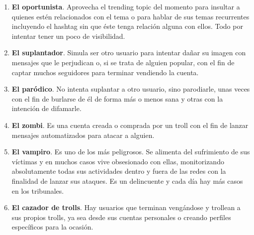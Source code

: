 \documentclass[../all.tex]{subfiles}
\begin{document}
\begin{enumerate}[resume]
        \item \textbf{El oportunista}. Aprovecha el trending topic del momento para insultar a quienes estén relacionados con el tema o para hablar de sus temas recurrentes incluyendo el hashtag sin que éste tenga relación alguna con ellos. Todo por intentar tener un poco de visibilidad.
        \item \textbf{El suplantador}. Simula ser otro usuario para intentar dañar su imagen con mensajes que le perjudican o, si se trata de alguien popular, con el fin de captar muchos seguidores para terminar vendiendo la cuenta.
        \item \textbf{El paródico}. No intenta suplantar a otro usuario, sino parodiarle, unas veces con el fin de burlarse de él de forma más o menos sana y otras con la intención de difamarle.
        \item \textbf{El zombi}. Es una cuenta creada o comprada por un troll con el fin de lanzar mensajes automatizados para atacar a alguien.
        \item \textbf{El vampiro}. Es uno de los más peligrosos. Se alimenta del sufrimiento de sus víctimas y en muchos casos vive obsesionado con ellas, monitorizando absolutamente todas sus actividades dentro y fuera de las redes con la finalidad de lanzar sus ataques. Es un delincuente y cada día hay más casos en los tribunales.
        \item \textbf{El cazador de trolls}. Hay usuarios que terminan vengándose y trollean a sus propios trolls, ya sea desde sus cuentas personales o creando perfiles específicos para la ocasión.
    \end{enumerate}
    
\newpage
\end{document}
